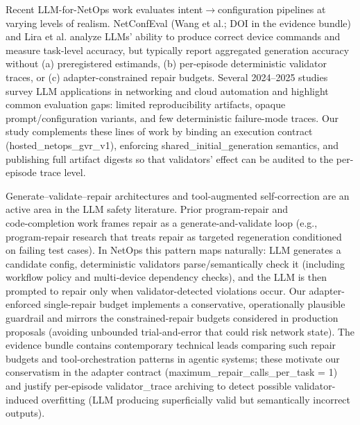 \documentclass[conference]{IEEEtran}
\begin{document}
Recent LLM-for-NetOps work evaluates intent\ensuremath{\rightarrow}configuration pipelines at varying levels of realism. NetConfEval (Wang et al.; DOI in the evidence bundle) and Lira et al. analyze LLMs' ability to produce correct device commands and measure task-level accuracy, but typically report aggregated generation accuracy without (a) preregistered estimands, (b) per-episode deterministic validator traces, or (c) adapter-constrained repair budgets. Several 2024--2025 studies survey LLM applications in networking and cloud automation and highlight common evaluation gaps: limited reproducibility artifacts, opaque prompt/configuration variants, and few deterministic failure-mode traces. Our study complements these lines of work by binding an execution contract (hosted\_netops\_gvr\_v1), enforcing shared\_initial\_generation semantics, and publishing full artifact digests so that validators' effect can be audited to the per-episode trace level.

Generate--validate--repair architectures and tool-augmented self-correction are an active area in the LLM safety literature. Prior program-repair and code‑completion work frames repair as a generate-and-validate loop (e.g., program-repair research that treats repair as targeted regeneration conditioned on failing test cases). In NetOps this pattern maps naturally: LLM generates a candidate config, deterministic validators parse/semantically check it (including workflow policy and multi‑device dependency checks), and the LLM is then prompted to repair only when validator-detected violations occur. Our adapter-enforced single-repair budget implements a conservative, operationally plausible guardrail and mirrors the constrained-repair budgets considered in production proposals (avoiding unbounded trial-and-error that could risk network state). The evidence bundle contains contemporary technical leads comparing such repair budgets and tool-orchestration patterns in agentic systems; these motivate our conservatism in the adapter contract (maximum\_repair\_calls\_per\_task = 1) and justify per-episode validator\_trace archiving to detect possible validator-induced overfitting (LLM producing superficially valid but semantically incorrect outputs).
\end{document}
